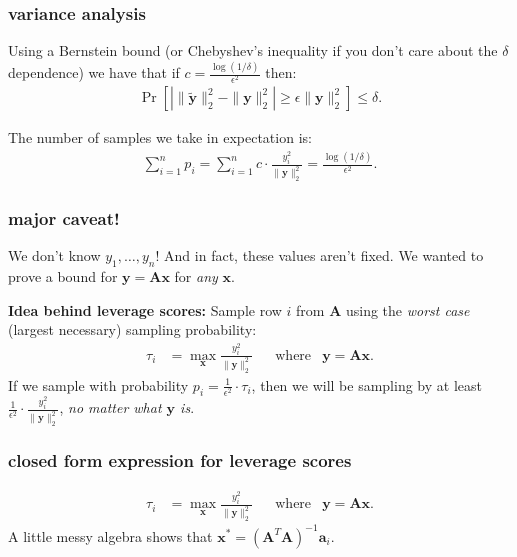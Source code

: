 \documentclass[compress]{beamer}
\newcommand{\bv}[1]{\mathbf{#1}}
\begin{document}
\begin{frame}[t]
	\frametitle{variance analysis}	
	Using a Bernstein bound (or Chebyshev's inequality if you don't care about the $\delta$ dependence) we have that if $c = \frac{\log(1/\delta)}{\epsilon^2}$ then:
	\begin{align*}
			\Pr[\left|\|\tilde{\bv{y}}\|_2^2 - \|\bv{y}\|_2^2\right| \geq \epsilon \|\bv{y}\|_2^2] \leq \delta.
	\end{align*}
	
	\vspace{4em}
	The number of samples we take in expectation is:
	\begin{align*}
		\sum_{i=1}^n p_i = \sum_{i=1}^n c\cdot \frac{y_i^2}{\|\bv{y}\|_2^2} = \frac{\log(1/\delta)}{\epsilon^2}. 
	\end{align*}
\end{frame}

\begin{frame}[t]
	\frametitle{major caveat!}	
	We don't know $y_1, \ldots, y_n$! And in fact, these values aren't fixed. We wanted to prove a bound for $\bv{y} = \bv{A}\bv{x}$ for \emph{any} $\bv{x}$. 
	
	\textbf{Idea behind leverage scores:} Sample row $i$ from $\bv{A}$ using the \emph{worst case} (largest necessary) sampling probability:
	\begin{align*}
		\tau_i &= \max_{\bv{x}} \frac{y_i^2}{\|\bv{y}\|_2^2} &&\text{where} & \bv{y} = \bv{A}\bv{x}. 
	\end{align*}
	If we sample with probability $p_i = \frac{1}{\epsilon^2}\cdot \tau_i$, then we will be sampling by at least $\frac{1}{\epsilon^2}\cdot\frac{y_i^2}{\|\bv{y}\|_2^2}$, \emph{no matter what $\bv{y}$ is}. 
\end{frame}	


\begin{frame}[t]
	\frametitle{closed form expression for leverage scores}
	\begin{align*}
		\tau_i &= \max_{\bv{x}} \frac{y_i^2}{\|\bv{y}\|_2^2} &&\text{where} & \bv{y} = \bv{A}\bv{x}. 
	\end{align*}
A little messy algebra shows that $\bv{x}^* = (\bv{A}^T\bv{A})^{-1}\bv{a}_i$.
\end{frame}
\end{document}
